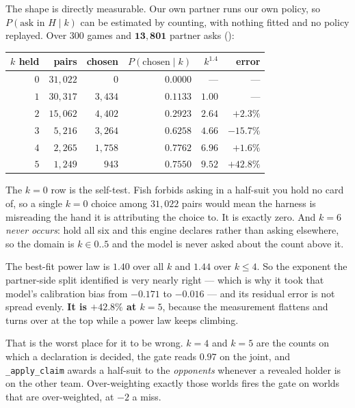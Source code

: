 \documentclass[11pt,letterpaper]{article}
\begin{document}
The shape is directly measurable. Our own partner runs our own policy, so
$P(\text{ask in } H \mid k)$ can be estimated by counting, with nothing fitted
and no policy replayed. Over $300$ games and $\mathbf{13{,}801}$ partner asks
():

\begin{center}
\small
\begin{tabular}{rrrrrr}
\toprule
$k$ held & pairs & chosen & $P(\text{chosen} \mid k)$ & $k^{1.4}$ & error \\
\midrule
$0$ & $31{,}022$ & $0$ & $\mathbf{0.0000}$ & --- & --- \\
$1$ & $30{,}317$ & $3{,}434$ & $0.1133$ & $1.00$ & --- \\
$2$ & $15{,}062$ & $4{,}402$ & $0.2923$ & $2.64$ & $+2.3\%$ \\
$3$ & $5{,}216$ & $3{,}264$ & $0.6258$ & $4.66$ & $-15.7\%$ \\
$4$ & $2{,}265$ & $1{,}758$ & $0.7762$ & $6.96$ & $+1.6\%$ \\
$5$ & $1{,}249$ & $943$ & $0.7550$ & $9.52$ & $\mathbf{+42.8\%}$ \\
\bottomrule
\end{tabular}
\end{center}

\noindent The $k=0$ row is the self-test. Fish forbids asking in a half-suit
you hold no card of, so a single $k=0$ choice among $31{,}022$ pairs would mean
the harness is misreading the hand it is attributing the choice to. It is
exactly zero. And $k=6$ \emph{never occurs}: hold all six and this engine
declares rather than asking elsewhere, so the domain is $k \in 0..5$ and the
model is never asked about the count above it.

The best-fit power law is $1.40$ over all $k$ and $1.44$ over $k \le 4$. So the
exponent the partner-side split identified is very nearly right --- which is why
it took that model's calibration bias from $-0.171$ to $-0.016$ --- and its
residual error is not spread evenly. \textbf{It is $+42.8\%$ at $k=5$}, because
the measurement flattens and turns over at the top while a power law keeps
climbing.

That is the worst place for it to be wrong. $k=4$ and $k=5$ are the counts on
which a declaration is decided, the gate reads $0.97$ on the joint, and
\texttt{\_apply\_claim} awards a half-suit to the \emph{opponents} whenever a
revealed holder is on the other team. Over-weighting exactly those worlds fires
the gate on worlds that are over-weighted, at $-2$ a miss.
\end{document}
